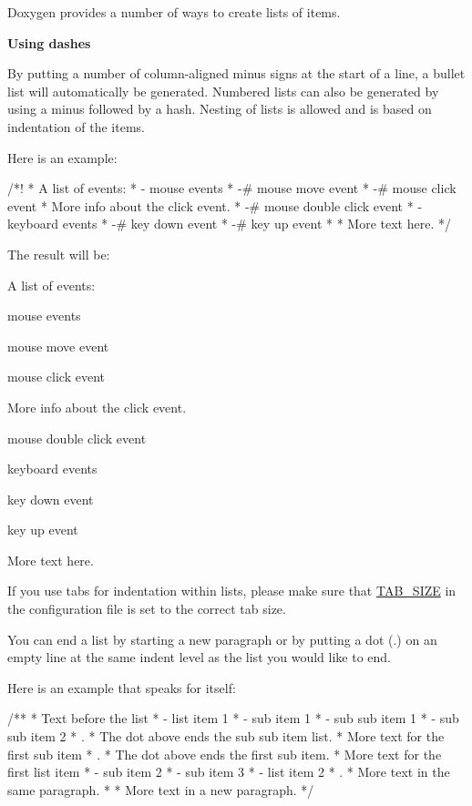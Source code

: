 Doxygen provides a number of ways to create lists of items.

{\bfseries Using dashes}

By putting a number of column-\/aligned minus signs at the start of a line, a bullet list will automatically be generated. Numbered lists can also be generated by using a minus followed by a hash. Nesting of lists is allowed and is based on indentation of the items.

Here is an example: \begin{DoxyVerb}
  /*! 
   *  A list of events:
   *    - mouse events
   *         -# mouse move event
   *         -# mouse click event\n
   *            More info about the click event.
   *         -# mouse double click event
   *    - keyboard events
   *         -# key down event
   *         -# key up event
   *
   *  More text here.
   */
\end{DoxyVerb}
 The result will be:

A list of events:
\begin{DoxyItemize}
\item mouse events
\begin{DoxyEnumerate}
\item mouse move event
\item mouse click event\par
 More info about the click event.
\item mouse double click event
\end{DoxyEnumerate}
\item keyboard events
\begin{DoxyEnumerate}
\item key down event
\item key up event
\end{DoxyEnumerate}
\end{DoxyItemize}

More text here.

If you use tabs for indentation within lists, please make sure that \hyperlink{config_cfg_tab_size}{TAB\_\-SIZE} in the configuration file is set to the correct tab size.

You can end a list by starting a new paragraph or by putting a dot (.) on an empty line at the same indent level as the list you would like to end.

Here is an example that speaks for itself:

\begin{DoxyVerb}
/**
 * Text before the list
 * - list item 1
 *   - sub item 1
 *     - sub sub item 1
 *     - sub sub item 2
 *     . 
 *     The dot above ends the sub sub item list.
 *     More text for the first sub item
 *   .
 *   The dot above ends the first sub item.
 *   More text for the first list item
 *   - sub item 2
 *   - sub item 3
 * - list item 2
 * .
 * More text in the same paragraph.
 *
 * More text in a new paragraph.
 */
\end{DoxyVerb}


